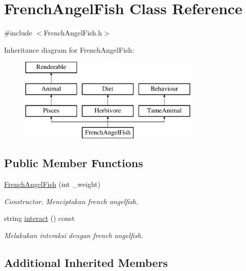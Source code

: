 \hypertarget{classFrenchAngelFish}{\section{French\+Angel\+Fish Class Reference}
\label{classFrenchAngelFish}
}


{\ttfamily \#include $<$French\+Angel\+Fish.\+h$>$}

Inheritance diagram for French\+Angel\+Fish\+:\begin{figure}[H]
\begin{center}
\leavevmode
\includegraphics[height=4.000000cm]{classFrenchAngelFish}
\end{center}
\end{figure}
\subsection*{Public Member Functions}
\begin{DoxyCompactItemize}
\item 
\hypertarget{classFrenchAngelFish_ae87d13dbe9c9ccd8abdfd1b877add9d2}{\hyperlink{classFrenchAngelFish_ae87d13dbe9c9ccd8abdfd1b877add9d2}{French\+Angel\+Fish} (int \+\_\+weight)}\label{classFrenchAngelFish_ae87d13dbe9c9ccd8abdfd1b877add9d2}

\begin{DoxyCompactList}\small\item\em Constructor. Menciptakan french angelfish. \end{DoxyCompactList}\item 
string \hyperlink{classFrenchAngelFish_a57bb0a609dcb55fac08f7e32f01319c8}{interact} () const 
\begin{DoxyCompactList}\small\item\em Melakukan interaksi dengan french angelfish. \end{DoxyCompactList}\end{DoxyCompactItemize}
\subsection*{Additional Inherited Members}


